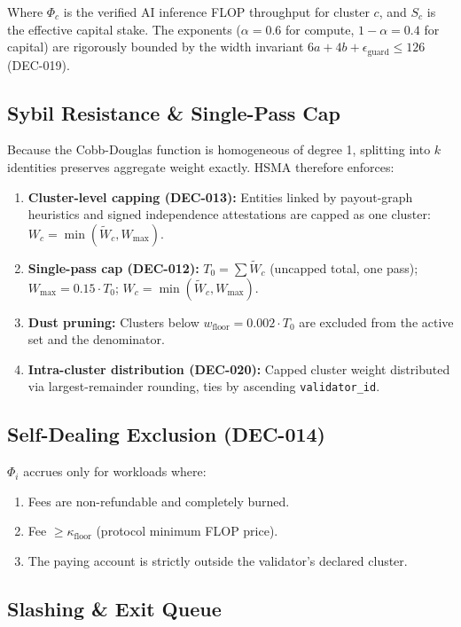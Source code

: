 \documentclass[11pt, a4paper]{article}
\begin{document}
Where $\Phi_c$ is the verified AI inference FLOP throughput for cluster $c$, and $S_c$ is the effective capital stake. The exponents ($\alpha = 0.6$ for compute, $1 - \alpha = 0.4$ for capital) are rigorously bounded by the width invariant $6a + 4b + \epsilon_{\text{guard}} \le 126$ (DEC-019).

\subsection{Sybil Resistance \& Single-Pass Cap}

Because the Cobb-Douglas function is homogeneous of degree 1, splitting into $k$ identities preserves aggregate weight exactly. HSMA therefore enforces:

\begin{enumerate}
    \item \textbf{Cluster-level capping (DEC-013):} Entities linked by payout-graph heuristics and signed independence attestations are capped as one cluster: $W_c = \min(\tilde{W}_c, W_{\max})$.
    \item \textbf{Single-pass cap (DEC-012):} $T_0 = \sum \tilde{W}_c$ (uncapped total, one pass); $W_{\max} = 0.15 \cdot T_0$; $W_c = \min(\tilde{W}_c, W_{\max})$.
    \item \textbf{Dust pruning:} Clusters below $w_{\text{floor}} = 0.002 \cdot T_0$ are excluded from the active set and the denominator.
    \item \textbf{Intra-cluster distribution (DEC-020):} Capped cluster weight distributed via largest-remainder rounding, ties by ascending \texttt{validator\_id}.
\end{enumerate}

\subsection{Self-Dealing Exclusion (DEC-014)}

 $\Phi_i$ accrues only for workloads where:
\begin{enumerate}
    \item Fees are non-refundable and completely burned.
    \item Fee $\ge \kappa_{\text{floor}}$ (protocol minimum FLOP price).
    \item The paying account is strictly outside the validator's declared cluster.
\end{enumerate}

\subsection{Slashing \& Exit Queue}
\end{document}
